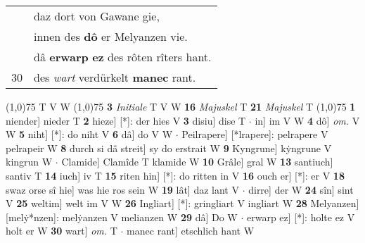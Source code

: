 \documentclass[8pt,a4paper,notitlepage]{article}
\begin{document}
\begin{table}[ht]
\begin{minipage}[t]{0.5\linewidth}
\begin{tabular}{rl}
 & daz dort von Gawane gie,\\ 
 & innen des \textbf{dô} er Melyanzen vie.\\ 
 & dâ \textbf{erwarp} \textbf{ez} des rôten rîters hant.\\ 
30 & des \textit{wart} verdürkelt \textbf{manec} rant.\\ 
\end{tabular}
\scriptsize
\line(1,0){75} \newline
T V W \newline
\line(1,0){75} \newline
\textbf{3} \textit{Initiale} T V W  \textbf{16} \textit{Majuskel} T  \textbf{21} \textit{Majuskel} T  \newline
\line(1,0){75} \newline
\textbf{1} niender] nieder T \textbf{2} hieze] [*]: der hies V \textbf{3} disiu] dise T  $\cdot$ in] im V W \textbf{4} dô] \textit{om.} V W \textbf{5} niht] [*]: do niht V \textbf{6} dâ] do V W  $\cdot$ Peilrapere] [*lrapere]: pelrapere V pelrapeir W \textbf{8} durch si dâ streit] sy do erstrait W \textbf{9} Kyngrune] kẏngrune V kingrun W  $\cdot$ Clamide] Clamîde T klamide W \textbf{10} Grâle] gral W \textbf{13} santiuch] santiv T \textbf{14} iuch] iv T \textbf{15} riten hin] [*]: do ritten in V \textbf{16} ouch er] [*]: er V \textbf{18} swaz orse sî hie] was hie ros sein W \textbf{19} lât] daz lant V  $\cdot$ dirre] der W \textbf{24} sîn] sint V \textbf{25} weltim] welt im V W \textbf{26} Ingliart] [*]: gringliart V ingliart W \textbf{28} Melyanzen] [melẏ*nzen]: melẏanzen V melianzen W \textbf{29} dâ] Do W  $\cdot$ erwarp ez] [*]: holte ez V holt er W \textbf{30} wart] \textit{om.} T  $\cdot$ manec rant] etschlich hant W \newline
\end{minipage}
\end{table}
\end{document}
